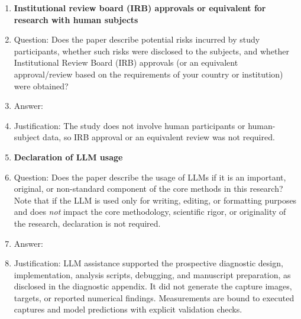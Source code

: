 \begin{enumerate}
\item {\bf Institutional review board (IRB) approvals or equivalent for research with human subjects}
    \item[] Question: Does the paper describe potential risks incurred by study participants, whether such risks were disclosed to the subjects, and whether Institutional Review Board (IRB) approvals (or an equivalent approval/review based on the requirements of your country or institution) were obtained?
    \item[] Answer: \answerNA{}
    \item[] Justification: The study does not involve human participants or human-subject data, so IRB approval or an equivalent review was not required.


\item {\bf Declaration of LLM usage}
    \item[] Question: Does the paper describe the usage of LLMs if it is an important, original, or non-standard component of the core methods in this research? Note that if the LLM is used only for writing, editing, or formatting purposes and does \emph{not} impact the core methodology, scientific rigor, or originality of the research, declaration is not required.
    \item[] Answer: \answerYes{}
    \item[] Justification: LLM assistance supported the prospective diagnostic design, implementation, analysis scripts, debugging, and manuscript preparation, as disclosed in the diagnostic appendix. It did not generate the capture images, targets, or reported numerical findings. Measurements are bound to executed captures and model predictions with explicit validation checks.

\end{enumerate}
